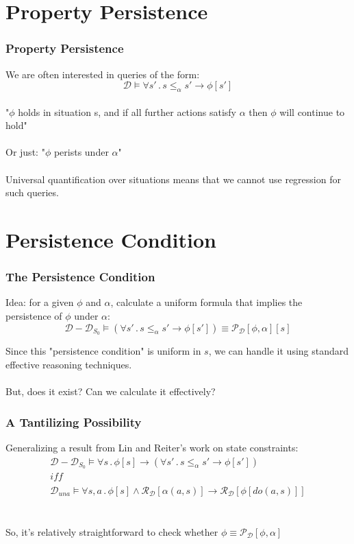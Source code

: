 \documentclass[compress]{beamer}
\begin{document}
\section{Property Persistence}

\begin{frame}
\frametitle{Property Persistence}
We are often interested in queries of the form:
\begin{equation*}
\mathcal{D} \models \forall s'\,.\,s \leq_{\alpha} s' \rightarrow \phi[s']
\end{equation*}
\ \\
"$\phi$ holds in situation s, and if all further actions satisfy $\alpha$ then $\phi$ will continue to hold"
\ \\
\ \\
Or just: "$\phi$ perists under $\alpha$"
\ \\
\ \\
Universal quantification over situations means that we cannot use regression
for such queries.
\end{frame}

\section{Persistence Condition}

\begin{frame}
\frametitle{The Persistence Condition}
Idea: for a given $\phi$ and $\alpha$, calculate a uniform formula that implies the persistence of $\phi$ under $\alpha$:
\begin{equation*}
  \mathcal{D}-\mathcal{D}_{S_0} \models \left(\forall s'\,.\,s \leq_{\alpha} s' \rightarrow \phi[s']\right) \equiv \mathcal{P}_{\mathcal{D}}[\phi,\alpha][s]
\end{equation*}

Since this "persistence condition" is uniform in $s$, we can handle it using
standard effective reasoning techniques.
\ \\
\ \\
But, does it exist? Can we calculate it effectively?
\end{frame}

\begin{frame}
\frametitle{A Tantilizing Possibility}
Generalizing a result from Lin and Reiter's work on state constraints:
\begin{gather*}
\mathcal{D}-\mathcal{D}_{S_{0}}\models\forall s\,.\,\phi[s]\rightarrow\left(\forall s'\,.\, s\leq_{\alpha}s'\rightarrow\phi[s']\right)\\
\mathit{iff}\\
\mathcal{D}_{una}\models\forall s,a\,.\,\phi[s]\wedge\mathcal{R}_{\mathcal{D}}[\alpha(a,s)]\rightarrow\mathcal{R}_{\mathcal{D}}[\phi[do(a,s)]]
\end{gather*}
\ \\
\ \\
So, it's relatively straightforward to check whether $\phi \equiv \mathcal{P}_{\mathcal{D}}[\phi,\alpha]$
\end{frame}
\end{document}

